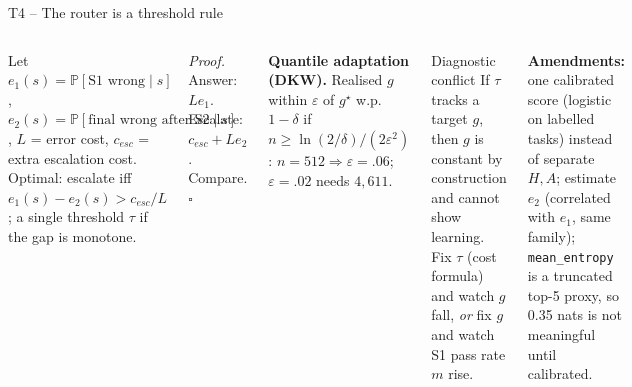 \documentclass[aspectratio=169,10pt]{beamer}
\renewcommand{\Pr}{\mathbb{P}}
\begin{document}
\begin{frame}{T4 -- The router is a threshold rule}
\begin{columns}[T]
\begin{theorem}[T4]\small
Let $e_1(s)=\Pr[\text{S1 wrong}\mid s]$, $e_2(s)=\Pr[\text{final wrong after S2}\mid s]$, $L$ = error cost, $c_{esc}$ = extra escalation cost. Optimal: escalate iff
$e_1(s)-e_2(s)>c_{esc}/L$; a single threshold $\tau$ if the gap is monotone.
\end{theorem}
\small\textit{Proof.} Answer: $Le_1$. Escalate: $c_{esc}+Le_2$. Compare. $\square$

\textbf{Quantile adaptation (DKW).} Realised $g$ within $\varepsilon$ of $g^{\star}$ w.p.\ $1-\delta$ if $n\ge\ln(2/\delta)/(2\varepsilon^2)$: $n{=}512\Rightarrow\varepsilon{=}.06$; $\varepsilon{=}.02$ needs $4{,}611$.
\begin{alertblock}{Diagnostic conflict}
\scriptsize If $\tau$ tracks a target $g$, then $g$ is constant by construction and cannot show learning. Fix $\tau$ (cost formula) and watch $g$ fall, \emph{or} fix $g$ and watch S1 pass rate $m$ rise.
\end{alertblock}

\scriptsize\textbf{Amendments:} one calibrated score (logistic on labelled tasks) instead of separate $H,A$; estimate $e_2$ (correlated with $e_1$, same family); \texttt{mean\_entropy} is a truncated top-5 proxy, so 0.35 nats is not meaningful until calibrated.
\end{columns}
\end{frame}
\end{document}
